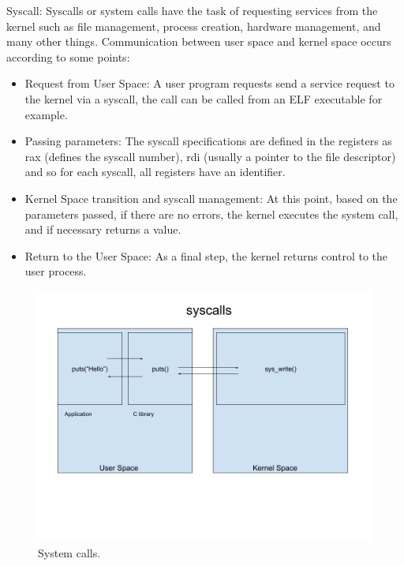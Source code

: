     Syscall: 
    Syscalls or system calls have the task of requesting services from the kernel such as file management, process creation, hardware management, and many other things.\newline
    Communication between user space and kernel space occurs according to some points:\newline
    \begin{itemize}
        \item Request from User Space: A user program requests send a service request to the kernel via a syscall, the call can be called from an ELF executable for example.\newline
        \item Passing parameters:  The syscall specifications are defined in the registers as rax (defines the syscall number), rdi (usually a pointer to the file descriptor) and so for each syscall, all registers have an identifier.\newline
        \item Kernel Space transition and syscall management: At this point, based on the parameters passed, if there are no errors, the kernel executes the system call, and if necessary returns a value.\newline
        \item Return to the User Space: As a final step, the kernel returns control to the user process.\newline
    \end{itemize}
\clearpage
    \begin{figure}[htbp]
        \centering
        \includegraphics[width=0.9\linewidth]{Images/syscall.png}
        \caption{System calls.}
        \label{fig:enter-label}
    \end{figure}


